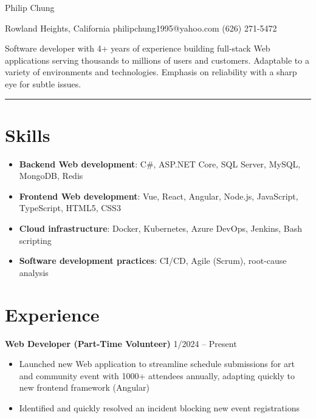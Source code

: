 \documentclass[12pt]{article}
\newcommand{\primaryheader}[4]{
	\textbf{#1}
	\ifthenelse{\equal{#3}{}}{}{%
		\symbol{"B7} #3 \ifthenelse{\equal{#4}{}}{}{(#4)}
	}
	\hfill #2%
}
\begin{document}
	{\centering

		{\headerfont\fontsize{24pt}{24pt}\selectfont Philip Chung}

		\vspace{0.25em}

		{\fontsize{10pt}{10pt}\selectfont Rowland Heights, California  philipchung1995@yahoo.com  (626) 271-5472}

	}

	\vspace{0.25em}

	{\fontsize{11pt}{14pt}\selectfont

		Software developer with 4+ years of experience building full-stack Web applications serving thousands to millions of users and customers. Adaptable to a variety of environments and technologies. Emphasis on reliability with a sharp eye for subtle issues.

	}

	\rule{\textwidth}{1pt}

	\section*{Skills}

	\newcommand{\skillitem}[2]{\item \textbf{#1}: #2}

	\begin{itemize}[left=0.25in .. 0.25in,label={},itemindent=-0.25in]
		\skillitem{Backend Web development}{C\#, ASP.NET Core, SQL Server, MySQL, MongoDB, Redis}
		\skillitem{Frontend Web development}{Vue, React, Angular, Node.js, JavaScript, TypeScript, HTML5, CSS3}
		\skillitem{Cloud infrastructure}{Docker, Kubernetes, Azure DevOps, Jenkins, Bash scripting}
		\skillitem{Software development practices}{CI/CD, Agile (Scrum), root-cause analysis}
	\end{itemize}

	\section*{Experience}

	\primaryheader{Web Developer (Part-Time Volunteer)}{1/2024 -- Present}{PNW}{Remote}

	\begin{itemize}
		\item Launched new Web application to streamline schedule submissions for art and community event with 1000+ attendees annually, adapting quickly to new frontend framework (Angular)
		\item Identified and quickly resolved an incident blocking new event registrations
	\end{itemize}
\end{document}
